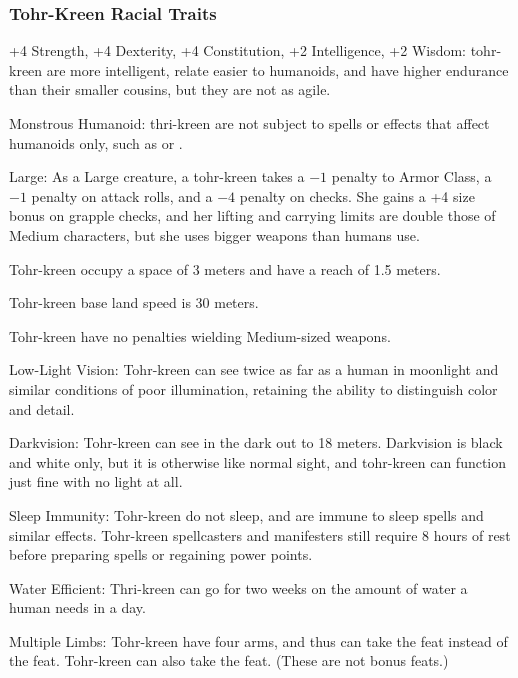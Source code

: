 
\subsubsection{Tohr-Kreen Racial Traits}
\begin{itemize*}
    \item +4 Strength, +4 Dexterity, +4 Constitution, +2 Intelligence, +2 Wisdom: tohr-kreen are more intelligent, relate easier to humanoids, and have higher endurance than their smaller cousins, but they are not as agile.
    \item Monstrous Humanoid: thri-kreen are not subject to spells or effects that affect humanoids only, such as  or .
    \item Large: As a Large creature, a tohr-kreen takes a $-1$ penalty to Armor Class, a $-1$ penalty on attack rolls, and a $-4$ penalty on  checks. She gains a +4 size bonus on grapple checks, and her lifting and carrying limits are double those of Medium characters, but she uses bigger weapons than humans use.
    \item Tohr-kreen occupy a space of 3 meters and have a reach of 1.5 meters.
    \item Tohr-kreen base land speed is 30 meters.
    \item Tohr-kreen have no penalties wielding Medium-sized weapons.

    \item Low-Light Vision: Tohr-kreen can see twice as far as a human in moonlight and similar conditions of poor illumination, retaining the ability to distinguish color and detail.
    \item Darkvision: Tohr-kreen can see in the dark out to 18 meters. Darkvision is black and white only, but it is otherwise like normal sight, and tohr-kreen can function just fine with no light at all.
    \item Sleep Immunity: Tohr-kreen do not sleep, and are immune to sleep spells and similar effects. Tohr-kreen spellcasters and manifesters still require 8 hours of rest before preparing spells or regaining power points.
    \item Water Efficient: Thri-kreen can go for two weeks on the amount of water a human needs in a day.
    \item Multiple Limbs: Tohr-kreen have four arms, and thus can take the  feat instead of the  feat. Tohr-kreen can also take the  feat. (These are not bonus feats.)


\end{itemize*}
